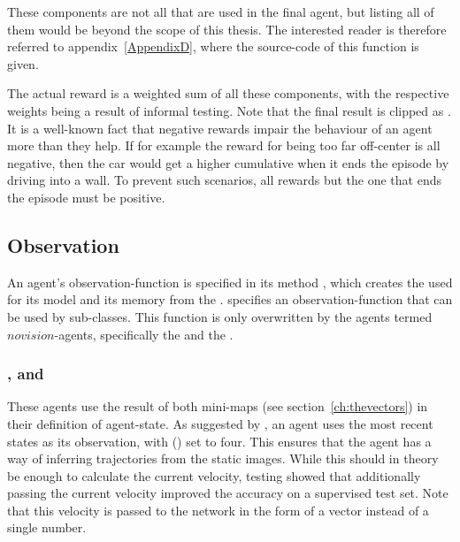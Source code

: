 These components are not all that are used in the final agent, but listing all of them would be beyond the scope of this thesis. The interested reader is therefore referred to appendix~\ref{AppendixD}, where the source-code of this function is given.

The actual reward is a weighted sum of all these components, with the respective weights being a result of informal testing. Note that the final result is clipped as . It is a well-known fact that negative rewards impair the behaviour of an agent more than they help. If for example the reward for being too far off-center is all negative, then the car would get a higher cumulative when it ends the episode by driving into a wall. To prevent such scenarios, all rewards but the one that ends the episode must be positive.


\subsection{Observation}

\label{sec:observation}

An agent's observation-function is specified in its method , which creates the  used for its model and its memory from the .  specifies an observation-function that can be used by sub-classes. This function is only overwritten by the agents termed $novision$-agents, specifically the  and the .

\subsubsection{,  and }

These agents use the result of both mini-maps (see section~\ref{ch:thevectors}) in their definition of agent-state. As suggested by \citet{mnih_human-level_2015}, an agent uses the  most recent states as its observation, with  () set to four. This ensures that the agent has a way of inferring trajectories from the static images. While this should in theory be enough to calculate the current velocity, testing showed that additionally passing the current velocity improved the accuracy on a supervised test set. Note that this velocity is passed to the network in the form of a vector instead of a single number.

